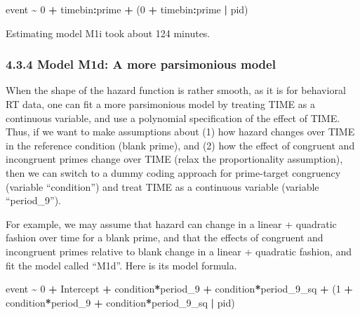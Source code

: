 \documentclass[
  man, donotrepeattitle,floatsintext]{apa6}
\newenvironment{Shaded}{\begin{snugshade}}{\end{snugshade}}
\newcommand{\DecValTok}[1]{\textcolor[rgb]{0.00,0.00,0.81}{#1}}
\newcommand{\NormalTok}[1]{#1}
\newcommand{\SpecialCharTok}[1]{\textcolor[rgb]{0.81,0.36,0.00}{\textbf{#1}}}
\begin{document}
\begin{Shaded}
\begin{Highlighting}[]
\NormalTok{event }\SpecialCharTok{\textasciitilde{}} \DecValTok{0} \SpecialCharTok{+}\NormalTok{ timebin}\SpecialCharTok{:}\NormalTok{prime }\SpecialCharTok{+}\NormalTok{ (}\DecValTok{0} \SpecialCharTok{+}\NormalTok{ timebin}\SpecialCharTok{:}\NormalTok{prime }\SpecialCharTok{|}\NormalTok{ pid)}
\end{Highlighting}
\end{Shaded}

Estimating model M1i took about 124 minutes.

\subsubsection{4.3.4 Model M1d: A more parsimonious model}\label{model-m1d-a-more-parsimonious-model}

When the shape of the hazard function is rather smooth, as it is for behavioral RT data, one can fit a more parsimonious model by treating TIME as a continuous variable, and use a polynomial specification of the effect of TIME. Thus, if we want to make assumptions about (1) how hazard changes over TIME in the reference condition (blank prime), and (2) how the effect of congruent and incongruent primes change over TIME (relax the proportionality assumption), then we can switch to a dummy coding approach for prime-target congruency (variable ``condition'') and treat TIME as a continuous variable (variable ``period\_9'').

For example, we may assume that hazard can change in a linear + quadratic fashion over time for a blank prime, and that the effects of congruent and incongruent primes relative to blank change in a linear + quadratic fashion, and fit the model called ``M1d''. Here is its model formula.

\begin{Shaded}
\begin{Highlighting}[]
\NormalTok{event }\SpecialCharTok{\textasciitilde{}} \DecValTok{0} \SpecialCharTok{+}\NormalTok{ Intercept }\SpecialCharTok{+}\NormalTok{ condition}\SpecialCharTok{*}\NormalTok{period\_9 }\SpecialCharTok{+}\NormalTok{ condition}\SpecialCharTok{*}\NormalTok{period\_9\_sq }\SpecialCharTok{+} 
\NormalTok{                   (}\DecValTok{1} \SpecialCharTok{+}\NormalTok{ condition}\SpecialCharTok{*}\NormalTok{period\_9 }\SpecialCharTok{+}\NormalTok{ condition}\SpecialCharTok{*}\NormalTok{period\_9\_sq }\SpecialCharTok{|}\NormalTok{ pid)}
\end{Highlighting}
\end{Shaded}
\end{document}
